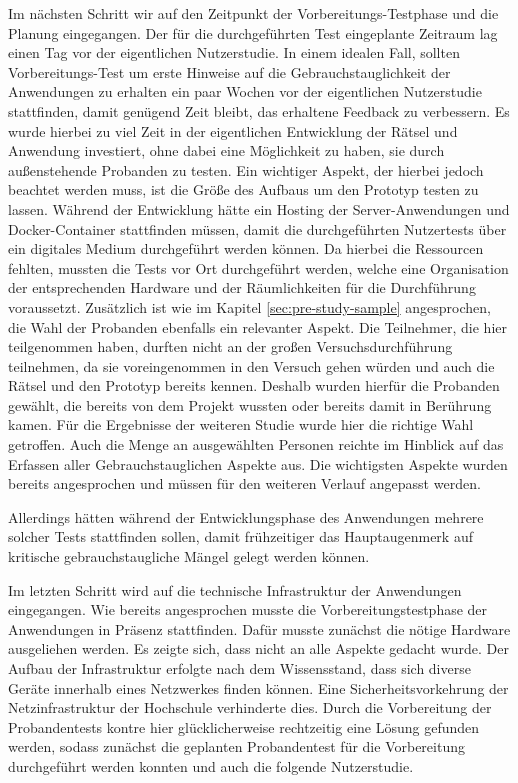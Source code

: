 Im nächsten Schritt wir auf den Zeitpunkt der Vorbereitungs-Testphase und die Planung eingegangen.
Der für die durchgeführten Test eingeplante Zeitraum lag einen Tag vor der eigentlichen Nutzerstudie. In einem idealen Fall, sollten Vorbereitungs-Test um erste Hinweise auf die Gebrauchstauglichkeit der Anwendungen zu erhalten ein paar Wochen vor der eigentlichen Nutzerstudie stattfinden, damit genügend Zeit bleibt, das erhaltene Feedback zu verbessern. Es wurde hierbei zu viel Zeit in der eigentlichen Entwicklung der Rätsel und Anwendung investiert, ohne dabei eine Möglichkeit zu haben, sie durch außenstehende Probanden zu testen. Ein wichtiger Aspekt, der hierbei jedoch beachtet werden muss, ist die Größe des Aufbaus um den Prototyp testen zu lassen. Während der Entwicklung hätte ein Hosting der Server-Anwendungen und Docker-Container stattfinden müssen, damit die durchgeführten Nutzertests über ein digitales Medium durchgeführt werden können. Da hierbei die Ressourcen fehlten, mussten die Tests vor Ort durchgeführt werden, welche eine Organisation der entsprechenden Hardware und der Räumlichkeiten für die Durchführung voraussetzt. Zusätzlich ist wie im Kapitel \ref{sec:pre-study-sample} angesprochen, die Wahl der Probanden ebenfalls ein relevanter Aspekt. Die Teilnehmer, die hier teilgenommen haben, durften nicht an der großen Versuchsdurchführung teilnehmen, da sie voreingenommen in den Versuch gehen würden und auch die Rätsel und den Prototyp bereits kennen. Deshalb wurden hierfür die Probanden gewählt, die bereits von dem Projekt wussten oder bereits damit in Berührung kamen. Für die Ergebnisse der weiteren Studie wurde hier die richtige Wahl getroffen. 
Auch die Menge an ausgewählten Personen reichte im Hinblick auf das Erfassen aller Gebrauchstauglichen Aspekte aus. Die wichtigsten Aspekte wurden bereits angesprochen und müssen für den weiteren Verlauf angepasst werden.

Allerdings hätten während der Entwicklungsphase des Anwendungen mehrere solcher Tests stattfinden sollen, damit frühzeitiger das Hauptaugenmerk auf kritische gebrauchstaugliche Mängel gelegt werden können.

Im letzten Schritt wird auf die technische Infrastruktur der Anwendungen eingegangen.
Wie bereits angesprochen musste die Vorbereitungstestphase der Anwendungen in Präsenz stattfinden. Dafür musste zunächst die nötige Hardware ausgeliehen werden. Es zeigte sich, dass nicht an alle Aspekte gedacht wurde. Der Aufbau der Infrastruktur erfolgte nach dem Wissensstand, dass sich diverse Geräte innerhalb eines Netzwerkes finden können. Eine Sicherheitsvorkehrung der Netzinfrastruktur der Hochschule verhinderte dies. Durch die Vorbereitung der Probandentests kontre hier glücklicherweise rechtzeitig eine Lösung gefunden werden, sodass zunächst die geplanten Probandentest für die Vorbereitung durchgeführt werden konnten und auch die folgende Nutzerstudie.

